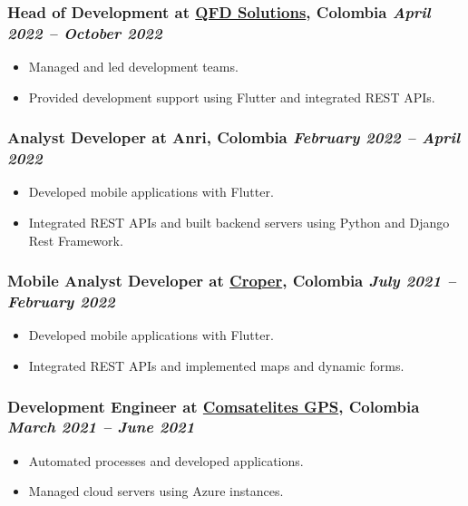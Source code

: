 \documentclass[a4paper,10pt]{article}
\begin{document}
\subsubsection*{%
  \textbf{Head of Development} at \href{https://www.linkedin.com/company/qfdsolutions/posts/?feedView=all}{QFD Solutions}, Colombia
  \hfill
  \textit{April 2022 -- October 2022}
}
\begin{itemize}
  \item Managed and led development teams.
  \item Provided development support using Flutter and integrated REST APIs.
\end{itemize}

\subsubsection*{%
  \textbf{Analyst Developer} at Anri, Colombia
  \hfill
  \textit{February 2022 -- April 2022}
}
\begin{itemize}
  \item Developed mobile applications with Flutter.
  \item Integrated REST APIs and built backend servers using Python and Django Rest Framework.
\end{itemize}

\subsubsection*{%
  \textbf{Mobile Analyst Developer} at \href{https://www.linkedin.com/company/agrofuturo/posts/?feedView=all}{Croper}, Colombia
  \hfill
  \textit{July 2021 -- February 2022}
}
\begin{itemize}
  \item Developed mobile applications with Flutter.
  \item Integrated REST APIs and implemented maps and dynamic forms.
\end{itemize}

\subsubsection*{%
  \textbf{Development Engineer} at \href{https://www.linkedin.com/company/comsatech/}{Comsatelites GPS}, Colombia
  \hfill
  \textit{March 2021 -- June 2021}
}
\begin{itemize}
  \item Automated processes and developed applications.
  \item Managed cloud servers using Azure instances.
\end{itemize}
\end{document}
